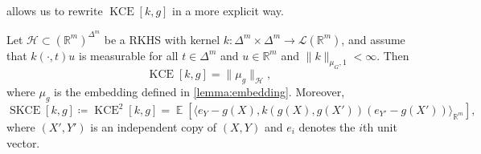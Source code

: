 \documentclass{article}
\DeclareMathOperator{\Expect}{\mathbb{E}}
\DeclareMathOperator{\kernelmeasure}{KCE}
\DeclareMathOperator{\squaredkernelmeasure}{SKCE}
\begin{document}
 allows us to rewrite $\kernelmeasure[k, g]$ in a
more explicit way.

\begin{lemma}\label{lemma:meance}
  Let $\mathcal{H} \subset {(\mathbb{R}^m)}^{\Delta^m}$ be a RKHS with kernel
  $k \colon \Delta^m \times \Delta^m \to \mathcal{L}(\mathbb{R}^m)$, and assume
  that $k(\cdot, t) u$ is measurable for all $t \in \Delta^m$ and
  $u \in \mathbb{R}^m$ and $\|k\|_{\mu_G,1} < \infty$. Then
  \begin{equation*}
    \kernelmeasure[k, g] = \|\mu_g\|_{\mathcal{H}},
  \end{equation*}
  where $\mu_g$ is the embedding defined in \cref{lemma:embedding}. Moreover,
  \begin{equation*}
    \squaredkernelmeasure[k, g] \coloneqq \kernelmeasure^2[k, g] = \Expect[\langle e_Y - g(X), k(g(X), g(X'))(e_{Y'} - g(X'))\rangle_{\mathbb{R}^m}],
  \end{equation*}
  where $(X', Y')$ is an independent copy of $(X,Y)$ and $e_i$ denotes the $i$th
  unit vector.
\end{lemma}
\end{document}

